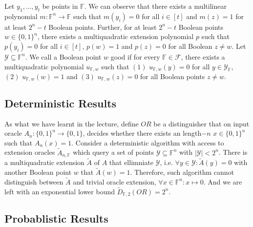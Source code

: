 \documentclass{article}
\begin{document}
  Let $y_1,\dots,y_t $ be points in $\mathbb{F}$. We can observe that there exists a multilinear polynomial $m: \mathbb{F}^n \rightarrow \mathbb{F} $ such that $m(y_i)=0 $ for all $i \in [t]$ and $m(z) = 1$ for at least $2^n-t$ Boolean points. Further, for at least  $2^n-t$ Boolean points $w \in \{0,1\}^n$, there exists a multiquadratic extension polynomial $p$ such that $p(y_i)=0$ for all $i \in [t]$, $p(w) = 1$ and $p(z) = 0$ for all Boolean $z \neq w$. Let $\mathcal{Y} \subseteq \mathbb{F}^n $. We call a Boolean point $w$ good if for every $\mathbb{F}\in\mathcal{F}$, there exists a multiquadratic polynomial $u_{\mathbb{F},w}$ such that $(1)$ $u_{\mathbb{F},w}(y)=0$ for all $y\in\mathcal{Y}_{\mathbb{F}}$, $(2)$ $u_{\mathbb{F},w}(w)=1$ and $(3)$ $u_{\mathbb{F},w}(z)=0$ for all Boolean points $z\neq w$.
 
 \subsection{Deterministic Results}
  
  As what we have learnt in the lecture, define $OR$ be a distinguisher that on input oracle $A_n:\{0,1\}^n\rightarrow\{0,1\}$, decides whether there exists an length$-n$ $x \in \{0,1\}^n$ such that $A_n(x) = 1$. Consider a deterministic algorithm with access to extension oracles $\tilde{A}_{n,\mathbb{F}}$ which query a set of points $\mathcal{Y} \subseteq \mathbb{F}^n$ with $|\mathcal{Y}| < 2^n$. There is a multiquadratic extension $\tilde{A}$ of $A$ that ellimniate $\mathcal{Y}$, i.e. $\forall y\in\mathcal{Y}: \tilde{A}(y)=0$ with another Boolean point $w$ that $\tilde{A}(w)=1$. Therefore, such algorithm cannot distinguish between $\tilde{A}$ and trivial oracle extension, $\forall x\in\mathbb{F}^n:x\mapsto 0$. And we are left with an exponential lower bound $\tilde{D}_{\mathbb{F},2}(OR)=2^n$.
  
  
  \subsection{Probablistic Results}
  
\end{document}
